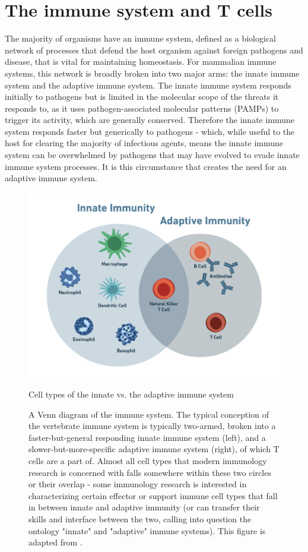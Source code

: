 \section{The immune system and T cells}
The majority of organisms have an immune system, defined as a biological network of processes that defend the host organism against foreign pathogens and disease, that is vital for maintaining homeostasis. For mammalian immune systems, this network is broadly broken into two major arms: the innate immune system and the adaptive immune system. The innate immune system responds initially to pathogens but is limited in the molecular scope of the threats it responds to, as it uses pathogen-associated molecular patterns (PAMPs) to trigger its activity, which are generally conserved. Therefore the innate immune system responds faster but generically to pathogens - which, while useful to the host for clearing the majority of infectious agents, means the innate immune system can be overwhelmed by pathogens that may have evolved to evade innate immune system processes. It is this circumstance that creates the need for an adaptive immune system.

\begin{figure}[htbp]
	\centering
	\includegraphics[width=\textwidth]{../figures/chapter1/innateadaptiveimmunesystem.png}
	\caption{Cell types of the innate vs. the adaptive immune system}
	\caption*{A Venn diagram of the immune system. The typical conception of the vertebrate immune system is typically two-armed, broken into a faster-but-general responding innate immune system (left), and a slower-but-more-specific adaptive immune system (right), of which T cells are a part of.  Almost all cell types that modern immunology research is concerned with falls somewhere within these two circles or their overlap - some immunology research is interested in characterizing certain effector or support immune cell types that fall in between innate and adaptive immunity (or can transfer their skills and interface between the two, calling into question the ontology "innate" and "adaptive" immune systems). This figure is adapted from \cite{Alam2007}.}
	\label{fig:innateadaptiveimmunesystem}
\end{figure}

